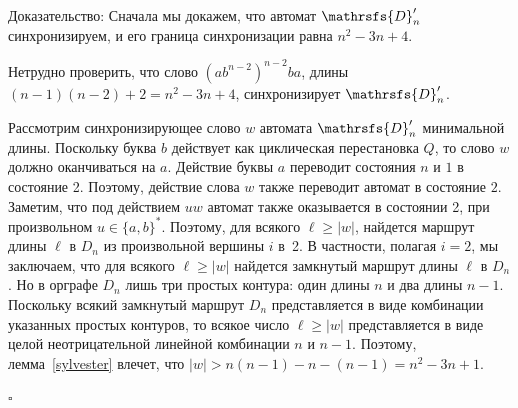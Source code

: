 \documentclass[11pt]{article}
\newcommand{\ssw}{reset word of minimum length}
\newenvironment{proof}{Доказательство:}{$\square$}
\begin{document}
\begin{proof}
Сначала мы докажем, что автомат $\mathrsfs{D}'_n$ синхронизируем, и его граница синхронизации
равна $n^2-3n+4$.

Нетрудно проверить, что слово $(ab^{n - 2})^{n - 2}ba$, длины 
$(n - 1)(n - 2) + 2 = n^2 -3n + 4$, синхронизирует $\mathrsfs{D}'_n$.


%

Рассмотрим синхронизирующее слово $w$ автомата $\mathrsfs{D}'_n$ минимальной
длины. Поскольку буква $b$ действует как циклическая перестановка $Q$, 
то слово $w$ должно оканчиваться на $a$. Действие буквы $a$ переводит
состояния $n$ и $1$ в состояние 2. Поэтому, действие слова $w$ также
переводит автомат в состояние $2$. Заметим, что под действием $uw$ автомат также
оказывается в состоянии 2, при произвольном $u\in\{a,b\}^*$.
Поэтому, для всякого $\ell\ge|w|$, найдется маршрут длины $\ell$ в $D_n$ из
произвольной вершины $i$ в~2. В частности, полагая $i=2$, мы заключаем, что 
для всякого $\ell\ge|w|$ найдется замкнутый маршрут длины $\ell$ в $D_n$. 
Но в орграфе $D_n$ лишь три простых контура: один длины $n$ и два длины $n-1$.
Поскольку всякий замкнутый маршрут $D_n$ представляется в виде комбинации
указанных простых контуров, то всякое число $\ell\ge|w|$ представляется в виде
целой неотрицательной линейной комбинации $n$ и $n-1$. 
Поэтому, лемма~\ref{sylvester} влечет, что $|w|>n(n-1)-n-(n-1)=n^2-3n+1$.





\end{proof}
\end{document}
